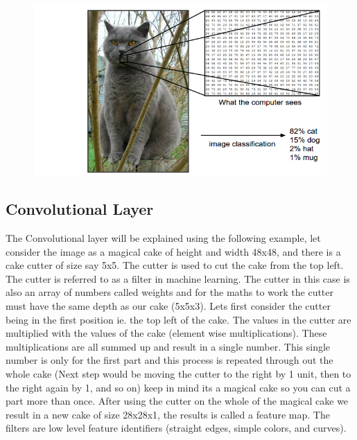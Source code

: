 \documentclass[12pt, a4paper,oneside]{report}
\begin{document}
\begin{figure}[htb!]
	\includegraphics [scale=0.5] {cat}
	\label{fig:cat}
\end{figure}

\subsection{Convolutional Layer}
The Convolutional layer will be explained using the following example, let consider the image as a magical cake of height and width 48x48, and there is a cake cutter of size say 5x5. The cutter is used to cut the cake from the top left. The cutter is referred to as a filter in machine learning. The cutter in this case is also an array of numbers called weights and for the maths to work the cutter must have the same depth as our cake (5x5x3).
Lets first consider the cutter being in the first position ie. the top left of the cake. The values in the cutter are multiplied with the values of the cake (element wise multiplications). These multiplications are all summed up and result in a single number. This single number is only for the first part and this process is repeated through out the whole cake (Next step would be moving the cutter to the right by 1 unit, then to the right again by 1, and so on) keep in mind its a magical cake so you can cut a part more than once. After using the cutter on the whole of the magical cake we result in a new cake of size 28x28x1, the results is called a feature map. The filters are low level feature identifiers (straight edges, simple colors, and curves). 
\end{document}
